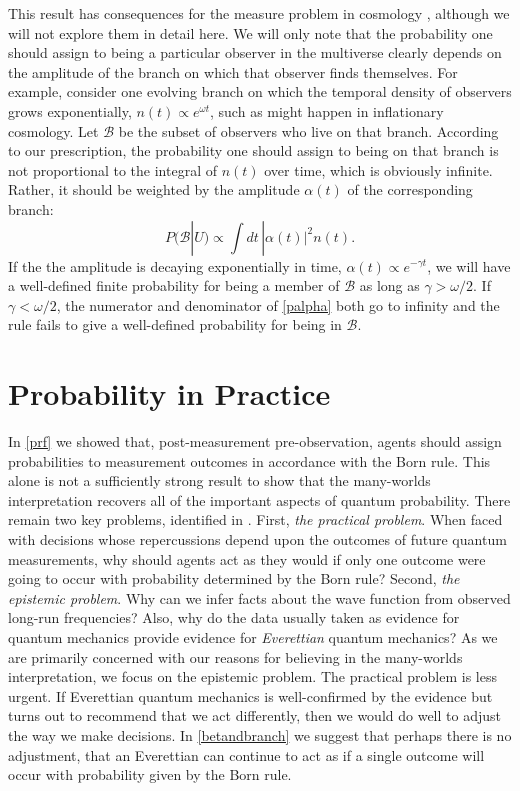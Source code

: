 \documentclass[12pt,onecolumn,secnumarabic,amsmath,amssymb,balancelastpage,nofootinbib]{article}
\begin{document}
This result has consequences for the measure problem in cosmology \citep{Freivogel:2011eg, Salem:2011qz, Vilenkin:2013ik}, although we will not explore them in detail here. We will only note that the probability one should assign to being a particular observer in the multiverse clearly depends on the amplitude of the branch on which that observer finds themselves. For example, consider one evolving branch on which the temporal density of observers grows exponentially, $n(t) \propto e^{\omega t}$, such as might happen in inflationary cosmology.  Let $\mathcal{B}$ be the subset of observers who live on that branch.  According to our prescription, the probability one should assign to being on that branch is not proportional to the integral of $n(t)$ over time, which is obviously infinite. Rather, it should be weighted by the amplitude $\alpha(t)$ of the corresponding branch:
\begin{equation}
  P(\mathcal{B}|U) \propto \int dt\, |\alpha(t)|^2 n(t). 
\end{equation}
If the the amplitude is decaying exponentially in time, $\alpha(t) \propto e^{-\gamma t}$, we will have a well-defined finite probability for being a member of $\mathcal{B}$ as long as $\gamma > \omega/2$.  If $\gamma < \omega/2$, the numerator and denominator of \eqref{palpha} both go to infinity and the rule fails to give a well-defined probability for being in $\mathcal{B}$.

\section{Probability in Practice}\label{pinp}

In \textsection \ref{prf} we showed that, post-measurement pre-observation, agents should assign probabilities to measurement outcomes in accordance with the Born rule.  This alone is not a sufficiently strong result to show that the many-worlds interpretation recovers all of the important aspects of quantum probability.  There remain two key problems, identified in \citet{papineau, greaves2007b}.  First, \emph{the practical problem}.  When faced with decisions whose repercussions depend upon the outcomes of future quantum measurements, why should agents act as they would if only one outcome were going to occur with probability determined by the Born rule?  Second, \emph{the epistemic problem}.  Why can we infer facts about the wave function from observed long-run frequencies?  Also, why do the data usually taken as evidence for quantum mechanics provide evidence for \emph{Everettian} quantum mechanics?  As we are primarily concerned with our reasons for believing in the many-worlds interpretation, we focus on the epistemic problem.  The practical problem is less urgent.  If Everettian quantum mechanics is well-confirmed by the evidence but turns out to recommend that we act differently, then we would do well to adjust the way we make decisions. In \textsection \ref{betandbranch} we suggest that perhaps there is no adjustment, that an Everettian can continue to act as if a single outcome will occur with probability given by the Born rule.
\end{document}
